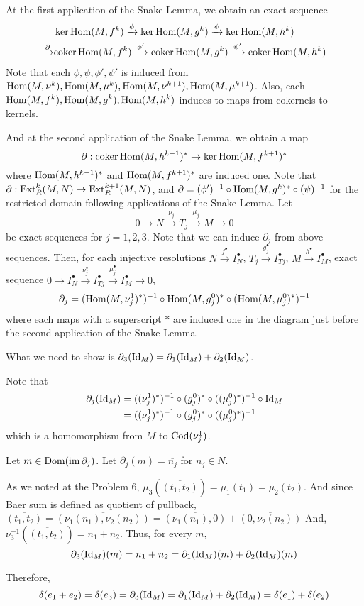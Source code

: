 At the first application of the Snake Lemma,
we obtain an exact sequence
\begin{align*}
  &\ker \textnormal{Hom}(M, f^k) \xrightarrow{\phi}
  \ker \textnormal{Hom}(M, g^k) \xrightarrow{\psi}
  \ker \textnormal{Hom}(M, h^k) \\
  \xrightarrow{\partial}
  &\textnormal{coker}\, \textnormal{Hom}(M, f^k) \xrightarrow{\phi'}
  \textnormal{coker}\, \textnormal{Hom}(M, g^k) \xrightarrow{\psi'}
  \textnormal{coker}\, \textnormal{Hom}(M, h^k)
\end{align*}
Note that each \(\phi, \psi, \phi', \psi'\) is induced from
\(\textnormal{Hom}(M, \nu^k), \textnormal{Hom}(M, \mu^k), \textnormal{Hom}(M, \nu^{k + 1}), \textnormal{Hom}(M, \mu^{k + 1})\).
Also, each \(\textnormal{Hom}(M, f^k), \textnormal{Hom}(M, g^k), \textnormal{Hom}(M, h^k)\) induces to maps from cokernels to kernels.

And at the second application of the Snake Lemma,
we obtain a map
\[\partial: \textnormal{coker}\, \textnormal{Hom}(M, h^{k - 1})^* \to \ker \textnormal{Hom}(M, f^{k + 1})^*\]
where \(\textnormal{Hom}(M, h^{k - 1})^*\) and \(\textnormal{Hom}(M, f^{k + 1})^*\) are induced one.
Note that \(\partial: \textnormal{Ext}_R^k(M, N) \to \textnormal{Ext}_R^{k + 1}(M, N)\),
and \(\partial = (\phi')^{-1} \circ \textnormal{Hom}(M, g^{k})^* \circ (\psi)^{-1}\)
for the restricted domain following applications of the Snake Lemma.
\br
\noindent
Let
\[0 \to N \xrightarrow{\nu_j} T_j \xrightarrow{\mu_j} M \to 0\]
be exact sequences for \(j = 1, 2, 3\).
Note that we can induce \(\partial_j\) from above sequences.
Then, for each injective resolutions
\(N \xrightarrow{f^\bullet} I_N^\bullet\),
\(T_j \xrightarrow{g_j^\bullet} I_{Tj}^\bullet\),
\(M \xrightarrow{h^\bullet} I_M^\bullet\),
exact sequence \(0 \to I_N^\bullet \xrightarrow{\nu_j^\bullet} I_{Tj}^\bullet \xrightarrow{\mu_j^\bullet} I_M^\bullet \to 0\),
\[\partial_j =
  (\textnormal{Hom}(M, \nu_j^1)^*)^{-1} \circ \textnormal{Hom}(M, g_j^0)^* \circ (\textnormal{Hom}(M, \mu_j^0)^*)^{-1}\]
where each maps with a superscript \(*\) are induced one in the diagram just before the second application of the Snake Lemma.

What we need to show is \(\partial_3(\textnormal{Id}_M) = \partial_1(\textnormal{Id}_M) + \partial_2(\textnormal{Id}_M)\).

Note that
\begin{align*}
  \partial_j(\textnormal{Id}_M)
  &= ((\nu_j^1)^*)^{-1} \circ (g_j^0)^* \circ ((\mu_j^0)^*)^{-1} \circ \textnormal{Id}_M
  \\&= ((\nu_j^1)^*)^{-1} \circ (g_j^0)^* \circ ((\mu_j^0)^*)^{-1}
\end{align*}
which is a homomorphism from \(M\) to \(\textnormal{Cod}(\nu_j^1)\).

Let \(m \in \textnormal{Dom}(\textnormal{im}\,\partial_j)\).
Let \(\partial_j(m) = \overline{n_j}\) for \(n_j \in N\).

As we noted at the Problem 6,
\(\mu_3(\overline{(t_1, t_2)}) = \mu_1(t_1) = \mu_2(t_2)\).
And since Baer sum is defined as quotient of pullback,
\(\overline{(t_1, t_2)}
= \overline{(\nu_1(n_1), \nu_2(n_2))}
= \overline{(\nu_1(n_1), 0)} + \overline{(0, \nu_2(n_2))}\)
And,
\(\nu_3^{-1}(\overline{(t_1, t_2)}) = n_1 + n_2\).
Thus, for every \(m\),
\[\partial_3(\textnormal{Id}_M)(m) = n_1 + n_2 = \partial_1(\textnormal{Id}_M)(m) + \partial_2(\textnormal{Id}_M)(m)\]

Therefore,
\[\delta(e_1 + e_2) = \delta(e_3) = \partial_3(\textnormal{Id}_M) = \partial_1(\textnormal{Id}_M) + \partial_2(\textnormal{Id}_M) = \delta(e_1) + \delta(e_2)\]
\qedsq